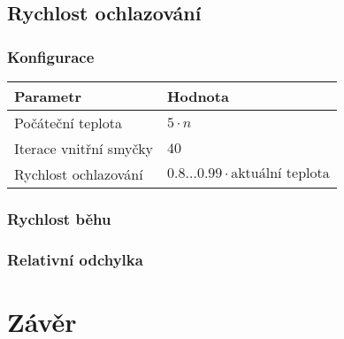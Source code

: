 \documentclass[czech]{article}
\begin{document}
\subsection{Rychlost ochlazování}

\subsubsection*{Konfigurace}

\begin{tabular}{ | l | l | }
    \hline
    Parametr & Hodnota \\ \hline \hline
    Počáteční teplota & $5 \cdot n$ \\
    Iterace vnitřní smyčky & $40$ \\
    Rychlost ochlazování & $0.8\dots0.99 \cdot \textrm{aktuální teplota}$ \\ \hline
\end{tabular}

\subsubsection*{Rychlost běhu}

\subsubsection*{Relativní odchylka}

\section{Závěr}
\end{document}
